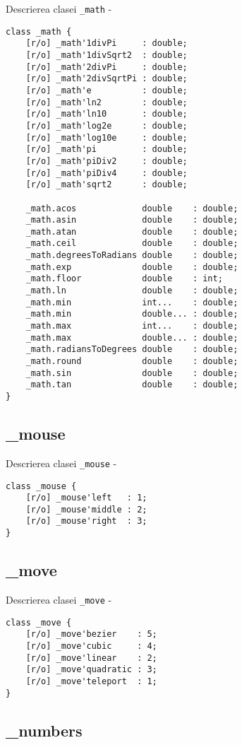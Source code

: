 \noindent Descrierea clasei \texttt{\_math} -
\begin{verbatim}
class _math {
	[r/o] _math'1divPi     : double;
	[r/o] _math'1divSqrt2  : double;
	[r/o] _math'2divPi     : double;
	[r/o] _math'2divSqrtPi : double;
	[r/o] _math'e          : double;
	[r/o] _math'ln2        : double;
	[r/o] _math'ln10       : double;
	[r/o] _math'log2e      : double;
	[r/o] _math'log10e     : double;
	[r/o] _math'pi         : double;
	[r/o] _math'piDiv2     : double;
	[r/o] _math'piDiv4     : double;
	[r/o] _math'sqrt2      : double;
	
	_math.acos             double    : double;
	_math.asin             double    : double;
	_math.atan             double    : double;
	_math.ceil             double    : double;
	_math.degreesToRadians double    : double;
	_math.exp              double    : double;
	_math.floor            double    : int;
	_math.ln               double    : double;
	_math.min              int...    : double;
	_math.min              double... : double;
	_math.max              int...    : double;
	_math.max              double... : double;
	_math.radiansToDegrees double    : double;
	_math.round            double    : double;
	_math.sin              double    : double;
	_math.tan              double    : double;
}
\end{verbatim}

\subsection{{\color{orange} \_mouse}}

\noindent Descrierea clasei \texttt{\_mouse} -
\begin{verbatim}
class _mouse {
	[r/o] _mouse'left   : 1;
	[r/o] _mouse'middle : 2;
	[r/o] _mouse'right  : 3;
}
\end{verbatim}

\subsection{{\color{orange} \_move}}

\noindent Descrierea clasei \texttt{\_move} -
\begin{verbatim}
class _move {
	[r/o] _move'bezier    : 5;
	[r/o] _move'cubic     : 4;
	[r/o] _move'linear    : 2;
	[r/o] _move'quadratic : 3;
	[r/o] _move'teleport  : 1;
}
\end{verbatim}

\subsection{{\color{orange} \_numbers}}

